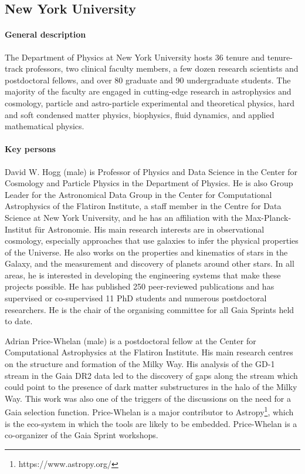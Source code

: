 \subsection{New York University}
\label{sec:nyu}

\paragraph{General description}

The Department of Physics at New York University hosts 36 tenure and tenure-track professors, two clinical faculty members, a few dozen research scientists and postdoctoral fellows, and over 80 graduate and 90 undergraduate students. The majority of the faculty are engaged in cutting-edge research in astrophysics and cosmology, particle and astro-particle experimental and theoretical physics, hard and soft condensed matter physics, biophysics, fluid dynamics, and applied mathematical physics.

\paragraph{Key persons}
David W. Hogg (male) is Professor of Physics and Data Science in the Center for Cosmology and Particle Physics in the Department of Physics. He is also Group Leader for the Astronomical Data Group in the Center for Computational Astrophysics of the Flatiron Institute, a staff member in the Centre for Data Science at New York University, and he has an affiliation with the Max-Planck-Institut für Astronomie. His main research interests are in observational cosmology, especially approaches that use galaxies to infer the physical properties of the Universe. He also works on the properties and kinematics of stars in the Galaxy, and the measurement and discovery of planets around other stars. In all areas, he is interested in developing the engineering systems that make these projects possible. He has published 250 peer-reviewed publications and has supervised or co-supervised 11 PhD students and numerous postdoctoral researchers. He is the chair of the organising committee for all Gaia Sprints held to date.

Adrian Price-Whelan (male) is a postdoctoral fellow at the Center for Computational Astrophysics at the Flatiron Institute. His main research centres on the structure and formation of the Milky Way. His analysis of the GD-1 stream in the Gaia DR2 data led to the discovery of gaps along the stream which could point to the presence of dark matter substructures in the halo of the Milky Way\cite{2018ApJ...863L..20P,2019ApJ...880...38B}. This work was also one of the triggers of the discussions on the need for a Gaia selection function. Price-Whelan is a major contributor to Astropy\footnote{https://www.astropy.org/}, which is the eco-system in which the {\acro} tools are likely to be embedded. Price-Whelan is a co-organizer of the Gaia Sprint workshops.

